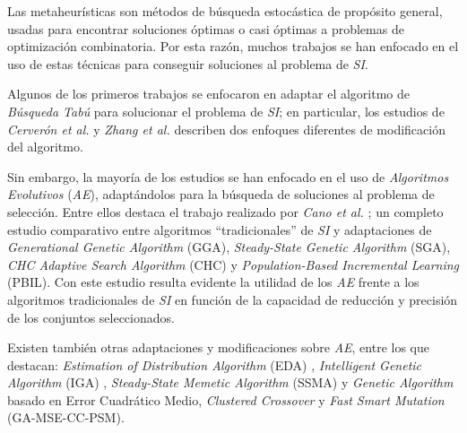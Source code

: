 Las metaheurísticas son métodos de búsqueda estocástica de propósito general, usadas para encontrar soluciones óptimas o casi óptimas a problemas de optimización combinatoria. Por esta razón, muchos trabajos se han enfocado en el uso de estas técnicas para conseguir soluciones al problema de \emph{SI}.

Algunos de los primeros trabajos se enfocaron en adaptar el algoritmo de \emph{Búsqueda Tabú} para solucionar el problema de \emph{SI}; en particular, los estudios de \emph{Cerverón et al.} \cite{cerveron2001another} y \emph{Zhang et al.} \cite{zhang2002optimal} describen dos enfoques diferentes de modificación del algoritmo.

Sin embargo, la mayoría de los estudios se han enfocado en el uso de \emph{Algoritmos Evolutivos} (\emph{AE}), adaptándolos para la búsqueda de soluciones al problema de selección. Entre ellos destaca el trabajo realizado por \emph{Cano et al.} \cite{cano2003using}; un completo estudio comparativo entre algoritmos ``tradicionales'' de \emph{SI} y adaptaciones de \emph{Generational Genetic Algorithm} (GGA), \emph{Steady-State Genetic Algorithm} (SGA), \emph{CHC Adaptive Search Algorithm} (CHC) y \emph{Population-Based Incremental Learning} (PBIL). Con este estudio resulta evidente la utilidad de los \emph{AE} frente a los algoritmos tradicionales de \emph{SI} en función de la capacidad de reducción y precisión de los conjuntos seleccionados.

Existen también otras adaptaciones y modificaciones sobre \emph{AE}, entre los que destacan: \emph{Estimation of Distribution Algorithm} (EDA) \cite{sierra2001prototype}, \emph{Intelligent Genetic Algorithm} (IGA) \cite{ho2002design}, \emph{Steady-State Memetic Algorithm} (SSMA) \cite{garcia2008memetic} y \emph{Genetic Algorithm} \cite{gil2008evolving} basado en Error Cuadrático Medio, \emph{Clustered Crossover} y \emph{Fast Smart Mutation} (GA-MSE-CC-PSM).

